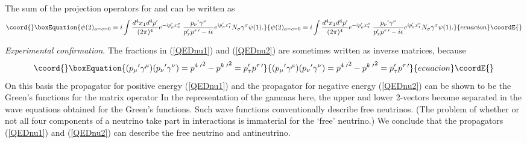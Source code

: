 \documentclass[a4paper,12pt]{article}
\begin{document}
	The sum of the projection operators for \coordHE{} and \coordHE{} can be written as
\begin{equation}\coord{}\boxEquation{	\label{QEDnu2}
\psi(2)_{a=c=0} = i\int \frac{d^4 x_{1} d^4 p^{\prime} }{(2 \pi)^4} e^{-ip_{\mu}^{\prime}x_{2}^{\mu}} \; \frac{ {p_{\nu}}^{\prime} \gamma^{\nu}}{p_{\tau}^{\prime}p^{\tau \, \prime}- i\epsilon} e^{ip_{\eta}^{\prime}x_{1}^{\eta}}  N_{\sigma} \gamma^{\sigma} \psi(1).
}{	\psi(2)_{a=c=0} = i\int \frac{d^4 x_{1} d^4 p^{\prime} }{(2 \pi)^4} e^{-ip_{\mu}^{\prime}x_{2}^{\mu}} \; \frac{ {p_{\nu}}^{\prime} \gamma^{\nu}}{p_{\tau}^{\prime}p^{\tau \, \prime}- i\epsilon} e^{ip_{\eta}^{\prime}x_{1}^{\eta}}  N_{\sigma} \gamma^{\sigma} \psi(1).
}{ecuacion}\coordE{}\end{equation}

	{\textit{Experimental confirmation}}. The fractions in (\ref{QEDnu1}) and (\ref{QEDnu2}) are sometimes written as inverse matrices, \coordHE{} because
\begin{equation}\coord{}\boxEquation{	\label{m-1,again}
({p_{\mu}}^{\prime} \gamma^{\mu})({p_{\nu}}^{\prime} \gamma^{\nu}) = {p^{4 \; \prime}}^{2} - {p^{k \; \prime}}^2  = p_{\tau}^{\prime}p^{\tau \, \prime}
}{	({p_{\mu}}^{\prime} \gamma^{\mu})({p_{\nu}}^{\prime} \gamma^{\nu}) = {p^{4 \; \prime}}^{2} - {p^{k \; \prime}}^2  = p_{\tau}^{\prime}p^{\tau \, \prime}
}{ecuacion}\coordE{}\end{equation}
On this basis the propagator for positive energy (\ref{QEDnu1}) and the propagator for negative energy (\ref{QEDnu2}) can be shown to be the Green's functions for the matrix operator \coordHE{} In the representation of the gammas here, the upper and lower 2-vectors become separated in the wave equations obtained for the Green's functions. Such wave functions conventionally describe free neutrinos. (The problem of whether or not all four components of a neutrino take part in interactions is immaterial for the `free' neutrino.) We conclude that the propagators (\ref{QEDnu1}) and (\ref{QEDnu2}) can describe the free neutrino and antineutrino.
\end{document}
